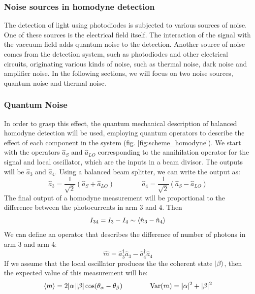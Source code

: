 \subsubsection{Noise sources in homodyne detection}
The detection of light using photodiodes is subjected to various sources of noise. One of these sources is the electrical field itself. The interaction of the signal with the vaccuum field adds quantum noise to the detection.
Another source of noise comes from the detection system, such as photodiodes and other electrical circuits, originating various kinds of noise, such as thermal noise, dark noise and amplifier noise.
\cite{hans2004}
In the following sections, we will focus on two noise sources, quantum noise and thermal noise.
%
%
%
\subsubsection{Quantum Noise}
In order to grasp this effect, the quantum mechanical description of balanced homodyne detection will be used, employing quantum operators to describe the effect of each component in the system (fig. \ref{fig:scheme_homodyne}). We start with the operators $\hat{a}_S$ and $\hat{a}_{LO}$ corresponding to the annihilation operator for the signal and local oscillator, which are the inputs in a beam divisor. The outputs will be $\hat{a}_3$ and $\hat{a}_4$.
Using a balanced beam splitter, we can write the output as:
%
\begin{equation}
\hat{a}_3 = \frac{1}{\sqrt{2}} \left( \hat{a}_S + \hat{a}_{LO} \right)
\qquad
\qquad
\hat{a}_4 = \frac{1}{\sqrt{2}} \left( \hat{a}_S - \hat{a}_{LO} \right)
\end{equation}
%
The final output of a homodyne measurement will be proportional to the difference between the photocurrents in arm $3$ and $4$. Then
%
\begin{equation}
I_{34} = I_3 - I_4 \sim \braket{\hat{n}_3 - \hat{n}_4}
\end{equation}
%
We can define an operator that describes the difference of number of photons in arm 3 and arm 4:
%
\begin{equation}
\hat{m} = \hat{a}^\dagger_3\hat{a}_3 - \hat{a}^\dagger_4\hat{a}_4
\end{equation}
%
If we assume that the local oscillator produces the the coherent state $\ket{\beta}$, then the expected value of this measurement will be:
%
\begin{equation}
\label{eq:noise}
\braket{m} = 2|\alpha||\beta|\cos({\theta_\alpha - \theta_\beta})
\qquad
\qquad
\textrm{Var}(m) = |\alpha|^2 + |\beta|^2
\end{equation}
